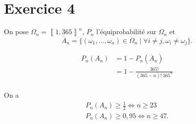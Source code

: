 \part{Exercice 4}

On pose $\Omega_n = \left\llbracket 1,365 \right\rrbracket^n$, $P_n$ l'équiprobabilité sur $\Omega_n$ et \[
	\overline{A}_n = \bigl\{(\omega_1,\ldots,\omega_n) \in \Omega_n\mid\forall i \neq j, \omega_i \neq \omega_j\bigr\}
.\] 

\begin{align*}
	P_n(A_n) &= 1 - P_n(\overline{A}_n)\\
	&= 1 - \frac{365!}{(365-n)!\;365^n} \\
\end{align*}

On a
\begin{gather*}
	P_n(A_n) \ge \frac{1}{2} \iff n \ge 23\\
	P_n(A_n) \ge 0,\!95 \iff n \ge 47.
\end{gather*}

